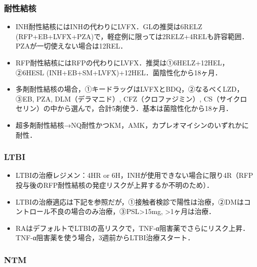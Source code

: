 \subsubsection{耐性結核}

\begin{itemize}
\item INH耐性結核にはINHの代わりにLVFX．GLの推奨は6RELZ (RFP+EB+LVFX+PZA)で，軽症例に限っては2RELZ+4RELも許容範囲．PZAが一切使えない場合は12REL．
\item RFP耐性結核にはRFPの代わりにLVFX．推奨は①6HELZ+12HEL，②6HESL (INH+EB+SM+LVFX)+12HEL．菌陰性化から18ヶ月．
\item 多剤耐性結核の場合，①キードラッグはLVFXとBDQ，②なるべくLZD，③EB, PZA, DLM（デラマニド）, CFZ（クロファジミン）, CS（サイクロセリン）の中から選んで，合計5剤使う．基本は菌陰性化から18ヶ月．
\item 超多剤耐性結核→NQ耐性かつKM，AMK，カプレオマイシンのいずれかに耐性．
\end{itemize}


\subsubsection{LTBI}

\begin{itemize}
\item LTBIの治療レジメン：4HR or 6H，INHが使用できない場合に限り4R（RFP投与後のRFP耐性結核の発症リスクが上昇するか不明のため）．
\item LTBIの治療適応は下記を参照だが，①接触者検診で陽性は治療，②DMはコントロール不良の場合のみ治療，③PSL>15mg, >1ヶ月は治療．
\item RAはデフォルトでLTBIの高リスクで，TNF-α阻害薬でさらにリスク上昇．TNF-α阻害薬を使う場合，3週前からLTBI治療スタート．


\end{itemize}


\subsubsection{NTM}

